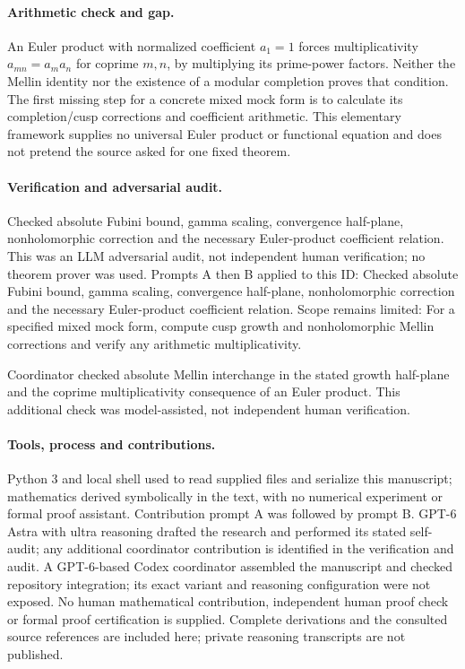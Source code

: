 \documentclass[11pt]{article}
\begin{document}
\paragraph{Arithmetic check and gap.}An Euler product with normalized coefficient \(a_1=1\) forces multiplicativity \(a_{mn}=a_ma_n\) for coprime \(m,n\), by multiplying its prime-power factors. Neither the Mellin identity nor the existence of a modular completion proves that condition. The first missing step for a concrete mixed mock form is to calculate its completion/cusp corrections and coefficient arithmetic. This elementary framework supplies no universal Euler product or functional equation and does not pretend the source asked for one fixed theorem.

\paragraph{Verification and adversarial audit.}
Checked absolute Fubini bound, gamma scaling, convergence half-plane, nonholomorphic correction and the necessary Euler-product coefficient relation. This was an LLM adversarial audit, not independent human verification; no theorem prover was used. Prompts A then B applied to this ID: Checked absolute Fubini bound, gamma scaling, convergence half-plane, nonholomorphic correction and the necessary Euler-product coefficient relation. Scope remains limited: For a specified mixed mock form, compute cusp growth and nonholomorphic Mellin corrections and verify any arithmetic multiplicativity.

Coordinator checked absolute Mellin interchange in the stated growth half-plane and the coprime multiplicativity consequence of an Euler product. This additional check was model-assisted, not independent human verification.

\paragraph{Tools, process and contributions.}
Python 3 and local shell used to read supplied files and serialize this manuscript; mathematics derived symbolically in the text, with no numerical experiment or formal proof assistant. Contribution prompt A was followed by prompt B. GPT-6 Astra with ultra reasoning drafted the research and performed its stated self-audit; any additional coordinator contribution is identified in the verification and audit. A GPT-6-based Codex coordinator assembled the manuscript and checked repository integration; its exact variant and reasoning configuration were not exposed. No human mathematical contribution, independent human proof check or formal proof certification is supplied. Complete derivations and the consulted source references are included here; private reasoning transcripts are not published.
\end{document}
